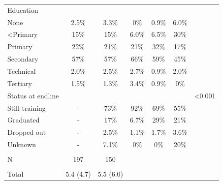 \documentclass[
  a4paper, twoside, 12pt]{book}
\begin{document}
\begin{singlespacing}
\begin{table}[H]
{\begin{threeparttable}
\begin{tabular}[t]{lcccccc}
\hspace{1em}Education &  &  &  &  &  & \\
\hspace{1em}\hspace{1em}None & 2.5\% & 3.3\% & 0\% & 0.9\% & 6.0\% & \\
\hspace{1em}\hspace{1em}<Primary & 15\% & 15\% & 6.0\% & 6.5\% & 30\% & \\
\hspace{1em}\hspace{1em}Primary & 22\% & 21\% & 21\% & 32\% & 17\% & \\
\hspace{1em}\hspace{1em}Secondary & 57\% & 57\% & 66\% & 59\% & 45\% & \\
\hspace{1em}\hspace{1em}Technical & 2.0\% & 2.5\% & 2.7\% & 0.9\% & 2.0\% & \\
\hspace{1em}\hspace{1em}Tertiary & 1.5\% & 1.3\% & 3.4\% & 0.9\% & 0\% & \\
\hspace{1em}Status at endline &  &  &  &  &  & <0.001\\
\hspace{1em}\hspace{1em}Still training & - & 73\% & 92\% & 69\% & 55\% & \\
\hspace{1em}\hspace{1em}Graduated & - & 17\% & 6.7\% & 29\% & 21\% & \\
\hspace{1em}\hspace{1em}Dropped out & - & 2.5\% & 1.1\% & 1.7\% & 3.6\% & \\
\hspace{1em}\hspace{1em}Unknown & - & 7.1\% & 0\% & 0\% & 20\% & \\
\addlinespace[0.3em]
\hline
\multicolumn{7}{l}{\textbf{Firms}}\\
\hspace{1em}N & 197 & 150 &  &  &  & \\
\addlinespace[0.3em]
\multicolumn{7}{l}{\hspace{1em}Apprentices trained}\\
\hspace{1em}\hspace{1em}Total & 5.4 (4.7) & 5.5 (6.0) &  &  &  & \\

\end{tabular}
\end{threeparttable}}
\end{table}
\end{singlespacing}
\end{document}
